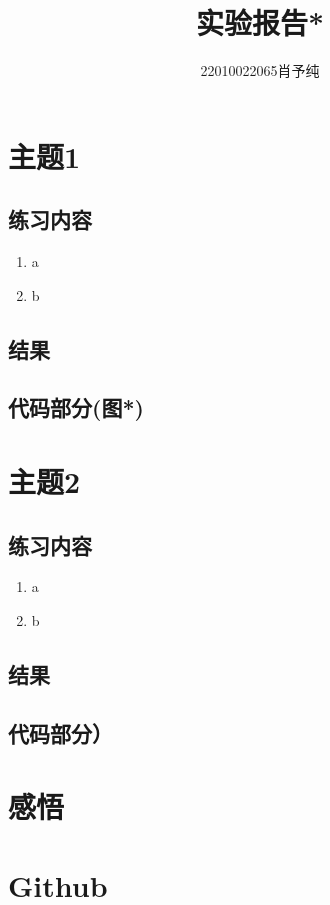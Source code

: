 \documentclass{article}
\begin{document}
	\title{实验报告*}
	\author{22010022065肖予纯}
	\maketitle
	\section{主题1}
	\subsection{练习内容}
	\begin{enumerate}
		\item a
		\item b
	\end{enumerate}
	
	
	
	\subsection{结果}

	\subsection{代码部分(图*)}

	
	
	
	
	\section{主题2}
	\subsection{练习内容}
	\begin{enumerate}
		\item a
		\item b
	\end{enumerate}
	\subsection{结果}
	\begin{figure}[h]
		\centering

	\end{figure}
	\subsection{代码部分）}
	\begin{figure}[h]
		\centering

	\end{figure}
	
	
	
	
	
	
	\section{感悟}
	
	
	
	\section{Github}
	
	
\end{document}
